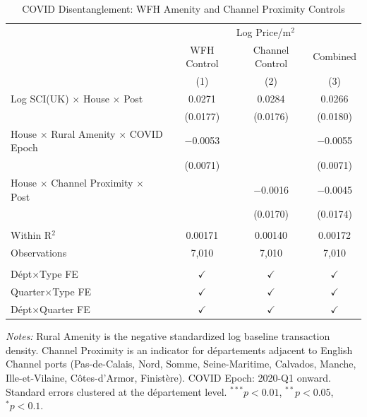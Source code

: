 
\begin{table}[htbp]
   \caption{\label{tab:covid} COVID Disentanglement: WFH Amenity and Channel Proximity Controls}
   \bigskip
   \centering
   \begin{tabular}{lccc}
      \toprule
       & \multicolumn{3}{c}{Log Price/m$^2$}\\
                                                              & WFH Control   & Channel Control & Combined \\
                                                              & (1)           & (2)             & (3)\\
      \midrule
      Log SCI(UK) $\times$ House $\times$ Post               & 0.0271        & 0.0284          & 0.0266\\
                                                              & (0.0177)      & (0.0176)        & (0.0180)\\
      House $\times$ Rural Amenity $\times$ COVID Epoch       & $-$0.0053     &                 & $-$0.0055\\
                                                              & (0.0071)      &                 & (0.0071)\\
      House $\times$ Channel Proximity $\times$ Post          &               & $-$0.0016       & $-$0.0045\\
                                                              &               & (0.0170)        & (0.0174)\\
       \\
      Within R$^2$                                            & 0.00171       & 0.00140         & 0.00172\\
      Observations                                            & 7,010         & 7,010           & 7,010\\
       \\
      D\'{e}pt$\times$Type FE                                & $\checkmark$  & $\checkmark$    & $\checkmark$\\
      Quarter$\times$Type FE                                  & $\checkmark$  & $\checkmark$    & $\checkmark$\\
      D\'{e}pt$\times$Quarter FE                              & $\checkmark$  & $\checkmark$    & $\checkmark$\\
      \bottomrule
   \end{tabular}
   \par\vspace{0.5em}\noindent\footnotesize{\textit{Notes:} Rural Amenity is the negative standardized log baseline transaction density. Channel Proximity is an indicator for d\'{e}partements adjacent to English Channel ports (Pas-de-Calais, Nord, Somme, Seine-Maritime, Calvados, Manche, Ille-et-Vilaine, C\^{o}tes-d'Armor, Finist\`{e}re). COVID Epoch: 2020-Q1 onward. Standard errors clustered at the d\'{e}partement level. $^{***}p<0.01$, $^{**}p<0.05$, $^{*}p<0.1$.}
\end{table}

